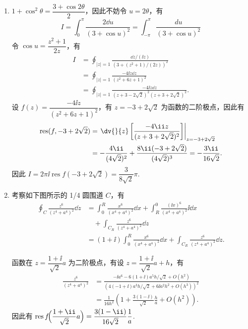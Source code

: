\begin{question}
\begin{solution}
\begin{enumerate}
  \item \(1+\cos^2\theta=\dfrac{3+\cos2\theta}{2}\)，因此不妨令 \(u=2\theta\)，有
\[
I=\int_0^{\pi}\frac{2\dd{u}}{(3+\cos u)^2}=\int_{-\pi}^{\pi}\frac{du}{(3+\cos u)^2}
\]
令 \(\cos u=\dfrac{z^2+1}{2z}\)，有
\[
\begin{aligned}
I
&=\oint_{|z|=1}\frac{\dd{z}/(\ii z)}
{\left(3+(z^2+1)/(2z)\right)^2}\\
&=\oint_{|z|=1}\frac{-4\ii z\dd{z}}{(z^2+6z+1)^2}\\
&=\oint_{|z|=1}
\frac{-4\ii z\dd{z}}
{(z+3-2\sqrt2)^2(z+3+2\sqrt2)^2}.
\end{aligned}
\]
设 \(f(z)=\dfrac{-4\ii z}{(z^2+6z+1)^2}\)，有 \(z=-3+2\sqrt2\) 为函数的二阶极点，因此有
\[
\begin{aligned}
\operatorname{res}(f,-3+2\sqrt2)
&=\left.\dv{}{z}\left[\frac{-4\ii z}{(z+3+2\sqrt2)^2}\right]
\right|_{z=-3+2\sqrt2}\\
&=-\frac{4\ii}{(4\sqrt2)^2}
+\frac{8\ii(-3+2\sqrt2)}{(4\sqrt2)^3}
=-\frac{3\ii}{16\sqrt2}.
\end{aligned}
\]
因此 \(I=2\pi\ii\operatorname{res}f(-3+2\sqrt2)=\dfrac{3}{8\sqrt2}\pi\).

  \item 考察如下图所示的 1/4 圆围道 \(C\)，有
\[
\begin{aligned}
\oint_C\frac{z^6}{(z^4+a^4)^2}\dd{z}
&=\int_0^R\frac{x^6}{(x^4+a^4)^2}\dd{x}
+\int_R^0\frac{(\ii x)^6}{(x^4+a^4)^2}\ii\dd{x}\\
&\quad+\int_{C_R}\frac{z^6}{(z^4+a^4)^2}\dd{z}\\
&=(1+\ii)\int_0^R\frac{x^6}{(x^4+a^4)^2}\dd{x}
+\int_{C_R}\frac{z^6}{(z^4+a^4)^2}\dd{z}.
\end{aligned}
\]

\begin{center}
\end{center}

函数在 \(z=\dfrac{1+\ii}{\sqrt2}a\) 为二阶极点，有设 \(z=\dfrac{1+\ii}{\sqrt2}a+h\)，有
\[
\begin{aligned}
\frac{z^6}{(z^4+a^4)^2}
&=\frac{-\ii a^6-6(1+\ii)a^5h/\sqrt2+O(h^2)}
{\left(4(-1+\ii)a^3h/\sqrt2+6\ii a^2h^2+O(h^3)\right)^2}\\
&=\frac1{16h^2}
\left(1+\frac{3(1-\ii)}{\sqrt2}\frac{h}{a}+O(h^2)\right).
\end{aligned}
\]
因此有 \(\operatorname{res}f\!\Bigl(\dfrac{1+\ii}{\sqrt2}a\Bigr)=\dfrac{3(1-\ii)}{16\sqrt2}\dfrac1a\).


\end{enumerate}
\end{solution}
\end{question}
